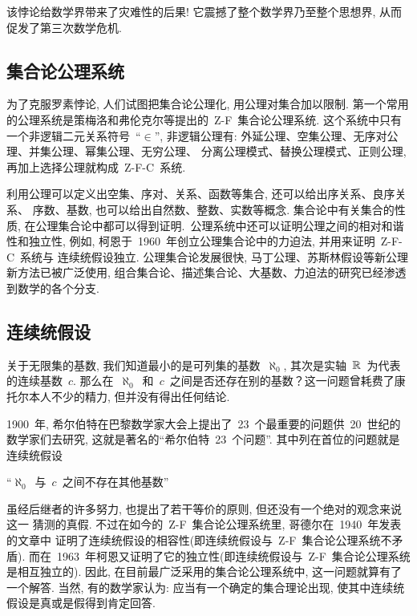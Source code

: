 该悖论给数学界带来了灾难性的后果! 它震撼了整个数学界乃至整个思想界, 从而促发了第三次数学危机.

\subsection*{集合论公理系统}

为了克服罗素悖论, 人们试图把集合论公理化, 用公理对集合加以限制.
第一个常用的公理系统是策梅洛和弗伦克尔等提出的~Z-F~集合论公理系统.
这个系统中只有一个非逻辑二元关系符号~``$\in$'', 非逻辑公理有: 外延公理、空集公理、无序对公理、并集公理、幂集公理、无穷公理、
分离公理模式、替换公理模式、正则公理, 再加上选择公理就构成~Z-F-C~系统.

利用公理可以定义出空集、序对、关系、函数等集合, 还可以给出序关系、良序关系、
序数、基数, 也可以给出自然数、整数、实数等概念. 集合论中有关集合的性质,
在公理集合论中都可以得到证明.\ 公理系统中还可以证明公理之间的相对和谐性和独立性,
例如, 柯恩于~1960~年创立公理集合论中的力迫法, 并用来证明~Z-F-C~系统与
连续统假设独立. 公理集合论发展很快, 马丁公理、苏斯林假设等新公理新方法已被广泛使用,
组合集合论、描述集合论、大基数、力迫法的研究已经渗透到数学的各个分支.

\subsection*{连续统假设}

关于无限集的基数, 我们知道最小的是可列集的基数~$\aleph_0$, 其次是实轴~$\mathbb{R}$~为代表的连续基数~$c$. 那么在~$\aleph_0$~和~$c$~之间是否还存在别的基数？这一问题曾耗费了康托尔本人不少的精力, 但并没有得出任何结论.

1900~年, 希尔伯特在巴黎数学家大会上提出了~23~个最重要的问题供~20~世纪的数学家们去研究, 这就是著名的``希尔伯特~23~个问题''. 其中列在首位的问题就是连续统假设

\begin{center}
``$\aleph_0$~与~$c$~之间不存在其他基数''
\end{center}

虽经后继者的许多努力, 也提出了若干等价的原则, 但还没有一个绝对的观念来说这一
猜测的真假. 不过在如今的~Z-F~集合论公理系统里, 哥德尔在~1940~年发表的文章中
证明了连续统假设的相容性(即连续统假设与~Z-F~集合论公理系统不矛盾). 而在~1963~年柯恩又证明了它的独立性(即连续统假设与~Z-F~集合论公理系统是相互独立的). 因此, 在目前最广泛采用的集合论公理系统中, 这一问题就算有了一个解答. 当然, 有的数学家认为: 应当有一个确定的集合理论出现, 使其中连续统假设是真或是假得到肯定回答.

\newpage

